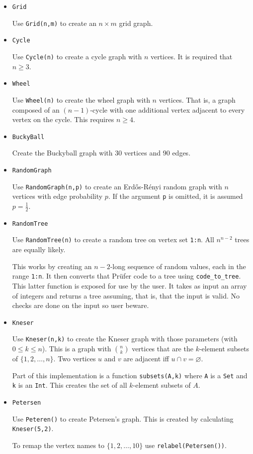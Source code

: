 \documentclass[oneside]{amsart}
\begin{document}
\begin{itemize}
\item \verb|Grid|

  Use \verb|Grid(n,m)| to create an $n\times m$ grid graph.

\item \verb|Cycle|

  Use \verb|Cycle(n)| to create a cycle graph with $n$ vertices. It is
  required that $n\ge3$.

\item \verb|Wheel|

  Use \verb|Wheel(n)| to create the wheel graph with $n$
  vertices. That is, a graph composed of an $(n-1)$-cycle with one
  additional vertex adjacent to every vertex on the cycle. This
  requires $n\ge4$.


\item \verb|BuckyBall|

  Create the Buckyball graph with $30$ vertices and $90$ edges.


\item \verb|RandomGraph|

  Use \verb|RandomGraph(n,p)| to create an Erd\H{o}s-R\'enyi random
  graph with $n$ vertices with edge probability $p$. If the argument
  \verb|p| is omitted, it is assumed $p=\frac12$.

\item \verb|RandomTree|

  Use \verb|RandomTree(n)| to create a random tree on vertex set
  \verb|1:n|. All $n^{n-2}$ trees are equally likely.

  This works by creating an $n-2$-long sequence of random values, each
  in the range \verb|1:n|. It then converts that Pr\"ufer code to a
  tree using \verb|code_to_tree|. This latter function is exposed for
  use by the user. It takes as input an array of integers and returns
  a tree assuming, that is, that the input is valid. No checks are
  done on the input so user beware.


\item \verb|Kneser|

  Use \verb|Kneser(n,k)| to create the Kneser graph with those
  parameters (with $0 \le k \le n$). This is a graph with $\binom nk$
  vertices that are the $k$-element subsets of $\{1,2,\ldots,n\}$. Two
  vertices $u$ and $v$ are adjacent iff $u \cap v = \varnothing$.

  Part of this implementation is a function \verb|subsets(A,k)| where
  \verb|A| is a \verb|Set| and \verb|k| is an \verb|Int|. This creates
  the set of all $k$-element subsets of $A$.


\item \verb|Petersen|

  Use \verb|Peteren()| to create Petersen's graph. This is created by
  calculating \verb|Kneser(5,2)|.

  To remap the vertex names to $\{1,2,\ldots,10\}$ use
  \verb|relabel(Petersen())|.


  \end{itemize}
\end{document}
